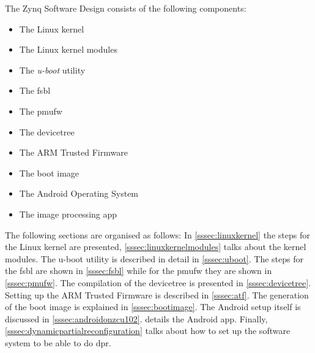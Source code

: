 The Zynq Software Design consists of the following components:
\begin{itemize}
	\item The Linux kernel
	\item The Linux kernel modules
	\item The \emph{u-boot} utility
	\item The \gls{fsbl}
	\item The \gls{pmufw}
	\item The devicetree
	\item The ARM Trusted Firmware
	\item The boot image
	\item The Android Operating System
	\item The image processing app
\end{itemize}

The following sections are organised as follows: In \cref{sssec:linuxkernel} the steps for the Linux kernel are presented, \cref{sssec:linuxkernelmodules} talks about the kernel modules. The u-boot utility is described in detail in \cref{sssec:uboot}. The steps for the \gls{fsbl} are shown in \cref{sssec:fsbl} while for the \gls{pmufw} they are shown in \cref{sssec:pmufw}. The compilation of the devicetree is presented in \cref{sssec:devicetree}. Setting up the ARM Trusted Firmware is described in \cref{sssec:atf}. The generation of the boot image is explained in \cref{sssec:bootimage}. The Android setup itself is discussed in \cref{sssec:androidonzcu102}.  details the Android app. Finally, \cref{sssec:dynamicpartialreconfiguration} talks about how to set up
the software system to be able to do \gls{dpr}.
